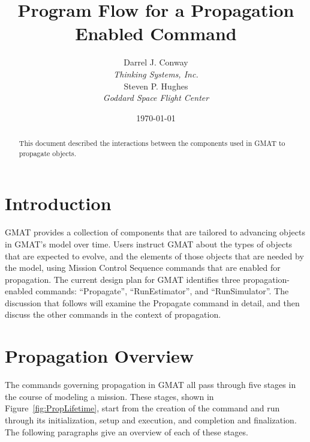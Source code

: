 \documentclass[10pt]{article}
\begin{document}
\title{Program Flow for a Propagation Enabled Command}
\author{Darrel J. Conway\\\textit{Thinking Systems, Inc.}\\
Steven P. Hughes\\\textit{Goddard Space Flight Center}}
\date{\today}
\maketitle

\begin{abstract}
This document described the interactions between the components used in GMAT to propagate objects.
\end{abstract}

\section{Introduction}

GMAT provides a collection of components that are tailored to advancing objects in GMAT's model over
time.  Users instruct GMAT about the types of objects that are expected to evolve, and the elements
of those objects that are needed by the model, using Mission Control Sequence commands that are
enabled for propagation.  The current design plan for GMAT identifies three propagation-enabled
commands: ``Propagate'', ``RunEstimator'', and ``RunSimulator''.  The discussion that follows will
examine the Propagate command in detail, and then discuss the other commands in the context of
propagation.

\section{Propagation Overview}

The commands governing propagation in GMAT all pass through five stages in the course of modeling a
mission.  These stages, shown in Figure~\ref{fig:PropLifetime}, start from the creation of the
command and run through its initialization, setup and execution, and completion and finalization.
The following paragraphs give an overview of each of these stages.
\end{document}
